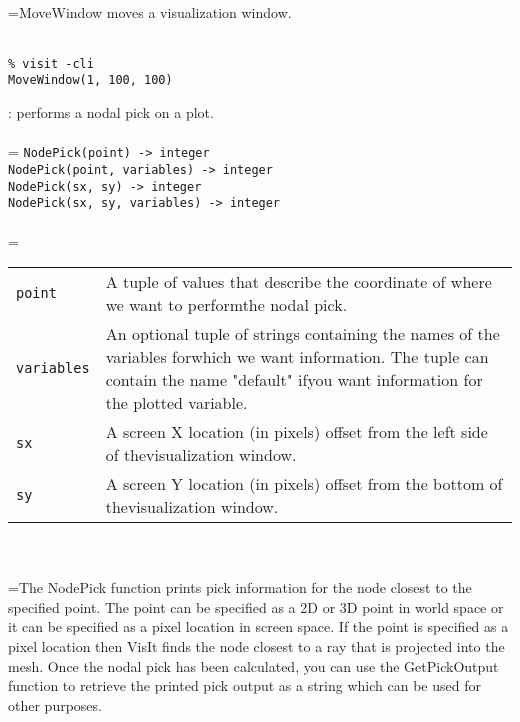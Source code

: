 \documentclass[10pt,a4paper]{report}
\begin{document}
 \\ 
\hangindent=\parindent MoveWindow moves a visualization window. \\[-3mm] 

\\[-6mm]
\begin{verbatim}% visit -cli
MoveWindow(1, 100, 100)
\end{verbatim}
\newpage


{}
: performs a nodal pick on a plot.\\[-3mm]

 \\ 
\hangindent=\parindent 
\verb!NodePick(point) -> integer!\\ 
\verb!NodePick(point, variables) -> integer!\\ 
\verb!NodePick(sx, sy) -> integer!\\ 
\verb!NodePick(sx, sy, variables) -> integer!\\ [-3mm]

 \\ 
\hangindent=\parindent 
\begin{tabular}{lp{9cm}}
\verb!point! & A tuple of values that describe the coordinate of where we want to performthe nodal pick. \\
\verb!variables! & An optional tuple of strings containing the names of the variables forwhich we want information. The tuple can contain the name "default" ifyou want information for the plotted variable. \\
\verb!sx! & A screen X location (in pixels) offset from the left side of thevisualization window. \\
\verb!sy! & A screen Y location (in pixels) offset from the bottom of thevisualization window. \\
\end{tabular} \\[-2mm]


 \\ 
\hangindent=\parindent The NodePick function prints pick information for the node closest to the specified point. The point can be specified as a 2D or 3D point in world space or it can be specified as a pixel location in screen space. If the point is specified as a pixel location then VisIt finds the node closest to a ray that is projected into the mesh. Once the nodal pick has been calculated, you can use the GetPickOutput function to retrieve the printed pick output as a string which can be used for other purposes. \\[-3mm] 
\end{document}
